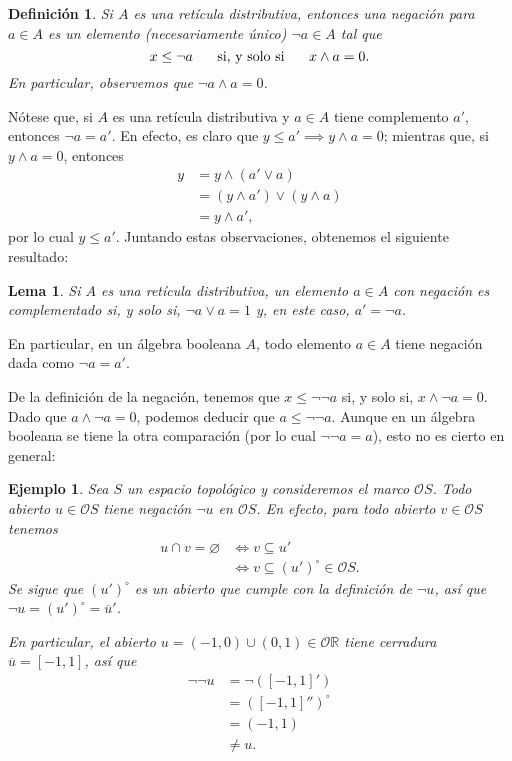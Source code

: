 \documentclass[12pt,letterpaper,titlepage]{article}
\let\emptyset\varnothing
\newtheorem*{defn}{Definición}
\newtheorem*{exa}{Ejemplo}
\newtheorem{lemma}{Lema}
\theoremstyle{definition}
\renewcommand\sup{\vee}
\newcommand\ol[1]{\overline{#1}}
\renewcommand\inf{\wedge}
\renewcommand\cal[1]{\mathcal{#1}}
\newcommand\ssi{\hspace{5mm}\text{ si, y solo si }\hspace{5mm}}
\newcommand\<{\langle}
\renewcommand\>{\rangle}
\begin{document}
\begin{defn}
    Si $A$ es una retícula distributiva, entonces una
    negación para $a\in A$ es un elemento
    (necesariamente único) $\neg a\in A$
    tal que
    \[
        x\leq \neg a \ssi x\inf a=0
    .\]
    En particular, observemos que $\neg a\inf a = 0$.
\end{defn}

Nótese que, si $A$ es una retícula distributiva
y $a\in A$ tiene complemento $a'$, entonces $\neg a=a'$.
En efecto, es claro que $y\leq a'\implies y\inf a=0$;
mientras que, si $y\inf a=0$, entonces
\begin{align*}
    y
    &= y\inf(a'\sup a) \\
    &= (y\inf a')\sup (y\inf a) \\
    &= y\inf a',
\end{align*}
por lo cual $y\leq a'$.
Juntando estas observaciones, obtenemos el siguiente resultado:
\begin{lemma}
   Si $A$ es una retícula distributiva,
   un elemento $a\in A$ con negación es complementado
   si, y solo si, $\neg a\sup a=1$ y, en este caso, $a'=\neg a$.
\end{lemma}

En particular, en un álgebra booleana $A$, todo elemento $a\in A$
tiene negación dada como $\neg a = a'$.

De la definición de la negación, tenemos que
$x\leq \neg\neg a$ si, y solo si, $x\inf\neg a=0$.
Dado que $a\inf\neg a=0$, podemos deducir que $a\leq\neg\neg a$.
Aunque en un álgebra booleana se tiene la otra comparación
(por lo cual $\neg\neg a = a$),
esto no es cierto en general:

\begin{exa}
  Sea $S$ un espacio topológico y consideremos el marco $\cal OS$.
  Todo abierto $u\in\cal O S$ tiene negación $\neg u$ en $\cal OS$.
  En efecto, para todo abierto $v\in\cal OS$ tenemos
  \begin{align*}
        u\cap v = \emptyset
        &\iff v\subseteq u' \\
        &\iff v\subseteq (u')^\circ \in\cal OS.
  \end{align*}
  Se sigue que $(u')^\circ$ es un abierto que cumple con la definición
  de $\neg u$, así que $\neg u = (u')^\circ = {\ol u}'$.
  
  En particular, el abierto $u=(-1,0)\cup(0,1)\in\cal O\mathbb R$
  tiene cerradura $\ol u = [-1,1]$, así que
  \begin{align*}
    \neg\neg u
    &= \neg([-1,1]') \\
    &= ([-1,1]'')^\circ \\
    &= (-1,1) \\
    &\neq u.
  \end{align*}
\end{exa}
\end{document}
